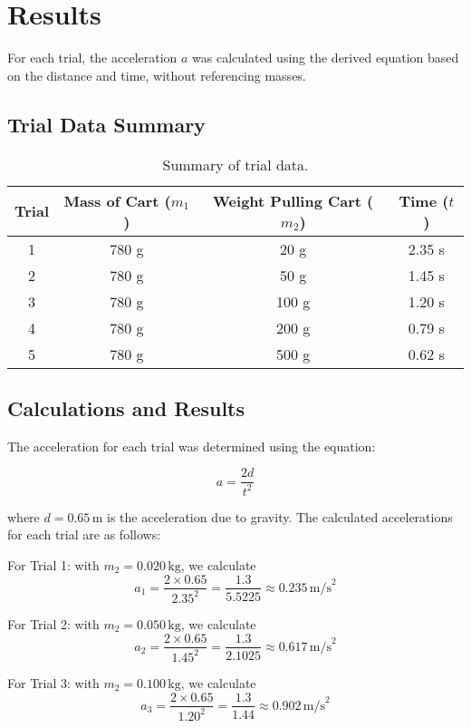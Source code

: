 \section{Results}

For each trial, the acceleration \( a \) was calculated using the derived equation based on the distance and time, without referencing masses.

\subsection{Trial Data Summary}

\begin{table}[h!]
    \centering
    \begin{tabular}{|c|c|c|c|}
        \hline
        Trial & Mass of Cart (\(m_1\)) & Weight Pulling Cart (\(m_2\)) & Time (\(t\)) \\
        \hline
        1 & 780 g & 20 g &  2.35 s\\
        2 & 780 g & 50 g & 1.45 s\\
        3 & 780 g & 100 g & 1.20 s\\
        4 & 780 g & 200 g & 0.79 s\\
        5 & 780 g & 500 g &  0.62 s\\
        \hline
    \end{tabular}
    \caption{Summary of trial data.}
\end{table}
  
\subsection{Calculations and Results}

The acceleration for each trial was determined using the equation:

\[
a = \frac{2d}{t^2}
\]

where \( d = 0.65   \, \text{m} \) is the acceleration due to gravity. The calculated accelerations for each trial are as follows:

For Trial 1: with \( m_2 = 0.020 \, \text{kg} \), we calculate
\[
a_1 = \frac{2 \times 0.65}{2.35^2} = \frac{1.3}{5.5225} \approx 0.235 \, \text{m/s}^2
\]

For Trial 2: with \( m_2 = 0.050 \, \text{kg} \), we calculate
\[
a_2 = \frac{2 \times 0.65}{1.45^2} = \frac{1.3}{2.1025} \approx 0.617 \, \text{m/s}^2
\]

For Trial 3: with \( m_2 = 0.100 \, \text{kg} \), we calculate
\[
a_3 = \frac{2 \times 0.65}{1.20^2} = \frac{1.3}{1.44} \approx  0.902 \, \text{m/s}^2
\]

